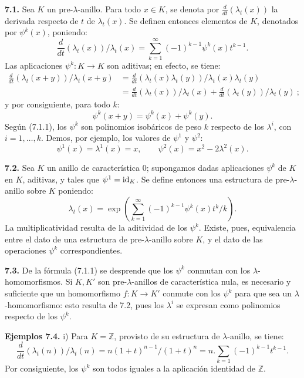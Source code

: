 \textbf{7.1.} Sea \(K\) un pre-\(\lambda\)-anillo. Para todo \(x\in K\), se denota por \(\frac{d}{dt}(\lambda_t(x))\) la derivada respecto de \(t\) de \(\lambda_t(x)\). Se definen entonces elementos de \(K\), denotados por \(\psi^k(x)\), poniendo:
\begin{equation}\tag{7.1.1}
  \frac{d}{dt}(\lambda_t(x))/\lambda_t(x)
  =
  \sum_{k=1}^{\infty}(-1)^{k-1}\psi^k(x)t^{k-1}.
\end{equation}
Las aplicaciones \(\psi^k:K\to K\) son aditivas; en efecto, se tiene:
\[
\begin{aligned}
 \frac{d}{dt}(\lambda_t(x+y))/\lambda_t(x+y)
 &=
 \frac{d}{dt}(\lambda_t(x)\lambda_t(y))/\lambda_t(x)\lambda_t(y)\\
 &=
 \frac{d}{dt}(\lambda_t(x))/\lambda_t(x)
 +\frac{d}{dt}(\lambda_t(y))/\lambda_t(y)\ ;
\end{aligned}
\]
y por consiguiente, para todo \(k\):
\[
  \psi^k(x+y)=\psi^k(x)+\psi^k(y).
\]
Según (7.1.1), los \(\psi^k\) son polinomios isobáricos de peso \(k\) respecto de los \(\lambda^i\), con \(i=1,\ldots,k\). Demos, por ejemplo, los valores de \(\psi^1\) y \(\psi^2\):
\[
  \psi^1(x)=\lambda^1(x)=x,
  \qquad
  \psi^2(x)=x^2-2\lambda^2(x).
\]

\textbf{7.2.} Sea \(K\) un anillo de característica \(0\); supongamos dadas aplicaciones \(\psi^k\) de \(K\) en \(K\), aditivas, y tales que \(\psi^1=\operatorname{id}_K\). Se define entonces una estructura de pre-\(\lambda\)-anillo sobre \(K\) poniendo:
\begin{equation}\tag{7.2.1}
  \lambda_t(x)=
  \exp\left(\sum_{k=1}^{\infty}(-1)^{k-1}\psi^k(x)t^k/k\right).
\end{equation}
La multiplicatividad resulta de la aditividad de los \(\psi^k\). Existe, pues, equivalencia entre el dato de una estructura de pre-\(\lambda\)-anillo sobre \(K\), y el dato de las operaciones \(\psi^k\) correspondientes.

\textbf{7.3.} De la fórmula (7.1.1) se desprende que los \(\psi^k\) conmutan con los \(\lambda\)-homomorfismos. Si \(K,K'\) son pre-\(\lambda\)-anillos de característica nula, es necesario y suficiente que un homomorfismo \(f:K\to K'\) conmute con los \(\psi^k\) para que sea un \(\lambda\)-homomorfismo: esto resulta de 7.2, pues los \(\lambda^i\) se expresan como polinomios respecto de los \(\psi^k\).

\textbf{Ejemplos 7.4.} i) Para \(K=\mathbb Z\), provisto de su estructura de \(\lambda\)-anillo, se tiene:
\[
  \frac{d}{dt}(\lambda_t(n))/\lambda_t(n)
  =
  n(1+t)^{n-1}/(1+t)^n
  =
  n.\sum_{k=1}(-1)^{k-1}t^{k-1}.
\]
Por consiguiente, los \(\psi^k\) son todos iguales a la aplicación identidad de \(\mathbb Z\).

